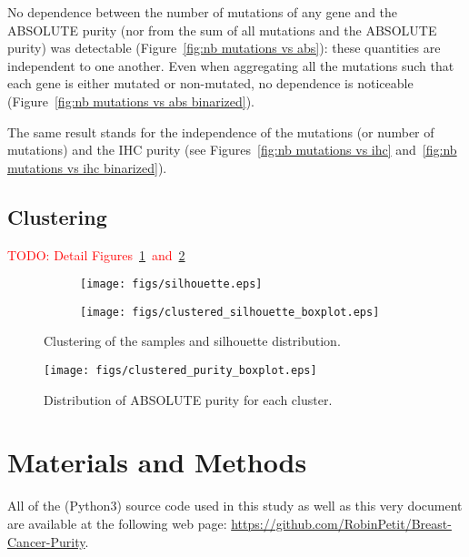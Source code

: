 \documentclass[letterpaper]{article}
\newcommand{\TODO}[1]{\textcolor{red}{TODO: {#1}}}
\begin{document}
No dependence between the number of mutations of any gene and the ABSOLUTE purity (nor from the sum of all mutations and the ABSOLUTE purity) was detectable
(Figure~\ref{fig:nb mutations vs abs}): these quantities are independent to one another. Even when aggregating all the mutations such that each gene is either
mutated or non-mutated, no dependence is noticeable (Figure~\ref{fig:nb mutations vs abs binarized}).

The same result stands for the independence of the mutations (or number of mutations) and the IHC purity (see Figures~\ref{fig:nb mutations vs ihc}
and~\ref{fig:nb mutations vs ihc binarized}).

\subsection{Clustering}

\TODO{Detail Figures~\ref{fig:clustering}~and~\ref{fig:boxplot purity}}

\begin{figure}
\hspace{-.5cm}
\begin{subfigure}{.5\textwidth}
\vspace{-.75cm}
\texttt{[image: figs/silhouette.eps]}
\end{subfigure}
\begin{subfigure}{.5\textwidth}
\texttt{[image: figs/clustered\_silhouette\_boxplot.eps]}
\end{subfigure}
\caption{Clustering of the samples and silhouette distribution.\label{fig:clustering}}
\end{figure}

\begin{figure}
\vspace{-.25cm}
\hspace{-.5cm}
\texttt{[image: figs/clustered\_purity\_boxplot.eps]}
\caption{Distribution of ABSOLUTE purity for each cluster.\label{fig:boxplot purity}}
\end{figure}

\section{Materials and Methods}
All of the (Python3) source code used in this study as well as this very document are available at the following web page: \url{https://github.com/RobinPetit/Breast-Cancer-Purity}.
\end{document}
